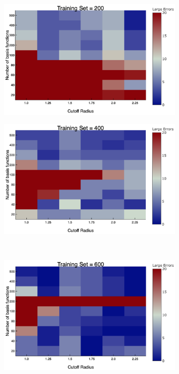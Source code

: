 \begin{figure}
  \centering
  \begin{subfigure}{0.5\textwidth}
    \includegraphics[width=\linewidth]{Figures/numErrors2}
    \caption{} 
    \label{numErrors2}
  \end{subfigure}%
  \hspace*{\fill}   %
  \begin{subfigure}{0.5\textwidth}
    \includegraphics[width=\linewidth]{Figures/numErrors4}
    \caption{} 
    \label{numErrors4}
  \end{subfigure}%
    \\
  \begin{subfigure}{0.5\textwidth}
    \includegraphics[width=\linewidth]{Figures/numErrors6}

\end{subfigure}
\end{figure}
